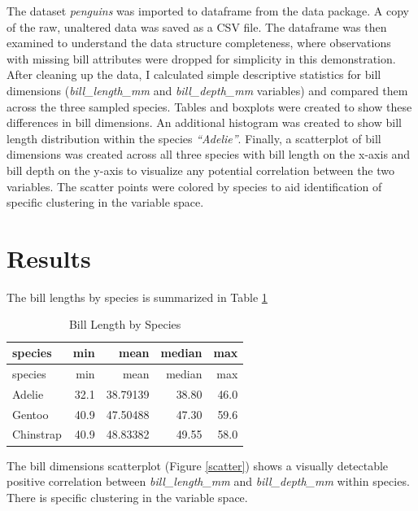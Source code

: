 \documentclass[preprint, 3p,
authoryear]{elsarticle} %
\begin{document}
The dataset \emph{penguins} was imported to dataframe from the data
package. A copy of the raw, unaltered data was saved as a CSV file. The
dataframe was then examined to understand the data structure
completeness, where observations with missing bill attributes were
dropped for simplicity in this demonstration. After cleaning up the
data, I calculated simple descriptive statistics for bill dimensions
(\emph{bill\_length\_mm} and \emph{bill\_depth\_mm} variables) and
compared them across the three sampled species. Tables and boxplots were
created to show these differences in bill dimensions. An additional
histogram was created to show bill length distribution within the
species \emph{``Adelie''}. Finally, a scatterplot of bill dimensions was
created across all three species with bill length on the x-axis and bill
depth on the y-axis to visualize any potential correlation between the
two variables. The scatter points were colored by species to aid
identification of specific clustering in the variable space.

\hypertarget{results}{%
\section{Results}\label{results}}

The bill lengths by species is summarized in Table \ref{billLen}

\begin{longtable}[]{@{}lrrrr@{}}
\caption{\label{billLen}Bill Length by Species}\tabularnewline
\toprule()
species & min & mean & median & max \\
\midrule()
\endfirsthead
\toprule()
species & min & mean & median & max \\
\midrule()
\endhead
Adelie & 32.1 & 38.79139 & 38.80 & 46.0 \\
Gentoo & 40.9 & 47.50488 & 47.30 & 59.6 \\
Chinstrap & 40.9 & 48.83382 & 49.55 & 58.0 \\
\bottomrule()
\end{longtable}

The bill dimensions scatterplot (Figure \ref{scatter}) shows a visually
detectable positive correlation between \emph{bill\_length\_mm} and
\emph{bill\_depth\_mm} within species. There is specific clustering in
the variable space.
\end{document}
